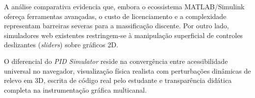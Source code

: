 \begin{table}[htbp]
    \centering
    \caption{Quadro comparativo entre o PID Simulator e ferramentas existentes na literatura e no mercado para o ensino de controle.}
    \label{tab:comparativo_ferramentas}
    \vspace{0.1cm}
\end{table}

A análise comparativa evidencia que, embora o ecossistema MATLAB/Simulink ofereça ferramentas avançadas, o custo de licenciamento e a complexidade representam barreiras severas para a massificação discente. Por outro lado, simuladores web existentes restringem-se à manipulação superficial de controles deslizantes (\textit{sliders}) sobre gráficos 2D. 

O diferencial do \textit{PID Simulator} reside na convergência entre acessibilidade universal no navegador, visualização física realista com perturbações dinâmicas de relevo em 3D, escrita de código real pelo estudante e transparência didática completa na instrumentação gráfica multicanal.
